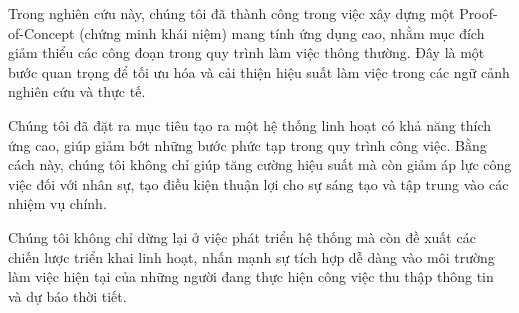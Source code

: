 Trong nghiên cứu này, chúng tôi đã thành công trong việc xây dựng một Proof-of-Concept (chứng minh khái niệm) mang tính ứng dụng cao, nhằm mục đích giảm thiểu các công đoạn trong quy trình làm việc thông thường. Đây là một bước quan trọng để tối ưu hóa và cải thiện hiệu suất làm việc trong các ngữ cảnh nghiên cứu và thực tế.

Chúng tôi đã đặt ra mục tiêu tạo ra một hệ thống linh hoạt có khả năng thích ứng cao, giúp giảm bớt những bước phức tạp trong quy trình công việc. Bằng cách này, chúng tôi không chỉ giúp tăng cường hiệu suất mà còn giảm áp lực công việc đối với nhân sự, tạo điều kiện thuận lợi cho sự sáng tạo và tập trung vào các nhiệm vụ chính.

Chúng tôi không chỉ dừng lại ở việc phát triển hệ thống mà còn đề xuất các chiến lược triển khai linh hoạt, nhấn mạnh sự tích hợp dễ dàng vào môi trường làm việc hiện tại của những người đang thực hiện công việc thu thập thông tin và dự báo thời tiết. 